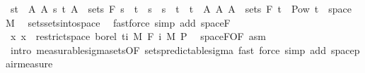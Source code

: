 \begin{isabellebody}
\ {\isachardoublequoteopen}{\isacharbraceleft}{\kern0pt}{\isacharbraceleft}{\kern0pt}s{\isacharless}{\kern0pt}{\isachardot}{\kern0pt}{\isachardot}{\kern0pt}t{\isacharbraceright}{\kern0pt}\ {\isasymtimes}\ A\ {\isacharbar}{\kern0pt}A\ s\ t{\isachardot}{\kern0pt}\ A\ {\isasymin}\ sets\ {\isacharparenleft}{\kern0pt}F\ s{\isacharparenright}{\kern0pt}\ {\isasymand}\ t\ {\isasymle}\ s\ {\isasymand}\ s\ {\isacharless}{\kern0pt}\ t{\isacharbraceright}{\kern0pt}\ {\isasymunion}\ {\isacharbraceleft}{\kern0pt}{\isacharbraceleft}{\kern0pt}t\ {\isasymtimes}\ A\ {\isacharbar}{\kern0pt}A{\isachardot}{\kern0pt}\ A\ {\isasymin}\ sets\ {\isacharparenleft}{\kern0pt}F\ t\ {\isasymsubseteq}\ Pow\ {\isacharparenleft}{\kern0pt}{\isacharbraceleft}{\kern0pt}t\ {\isasymtimes}\ space\ M{\isacharparenright}{\kern0pt}{\isachardoublequoteclose}\ \isamarkupfalse%
\ sets{\isachardot}{\kern0pt}sets{\isacharunderscore}{\kern0pt}into{\isacharunderscore}{\kern0pt}space\ \isamarkupfalse%
\ {\isacharparenleft}{\kern0pt}fastforce\ simp\ add{\isacharcolon}{\kern0pt}\ space{\isacharunderscore}{\kern0pt}F{\isacharparenright}{\kern0pt}\isanewline
\ \ \isamarkupfalse%
\ \isamarkupfalse%
\ {\isachardoublequoteopen}{\isacharparenleft}{\kern0pt}{\isasymlambda}x{\isachardot}{\kern0pt}\ x{\isacharparenright}{\kern0pt}\ {\isasymin}\ restrict{\isacharunderscore}{\kern0pt}space\ borel\ {\isacharbraceleft}{\kern0pt}ti{\isacharbraceright}{\kern0pt}\ {\isasymOtimes}\isactrlsub M\ F\ i\ {\isasymrightarrow}\isactrlsub M\ {\isasymSigma}\isactrlsub P{\isachardoublequoteclose}\ \isamarkupfalse%
\ space{\isacharunderscore}{\kern0pt}F{\isacharbrackleft}{\kern0pt}OF\ asm{\isacharbrackright}{\kern0pt}\ \isamarkupfalse%
\ {\isacharparenleft}{\kern0pt}intro\ measurable{\isacharunderscore}{\kern0pt}sigma{\isacharunderscore}{\kern0pt}sets{\isacharbrackleft}{\kern0pt}OF\ sets{\isacharunderscore}{\kern0pt}predictable{\isacharunderscore}{\kern0pt}sigma{\isacharbrackright}{\kern0pt}{\isacharparenright}{\kern0pt}\ {\isacharparenleft}{\kern0pt}fast{\isacharcomma}{\kern0pt}\ force\ simp\ add{\isacharcolon}{\kern0pt}\ space{\isacharunderscore}{\kern0pt}pair{\isacharunderscore}{\kern0pt}measure{\isacharparenright}{\kern0pt}\isanewline

\end{isabellebody}
